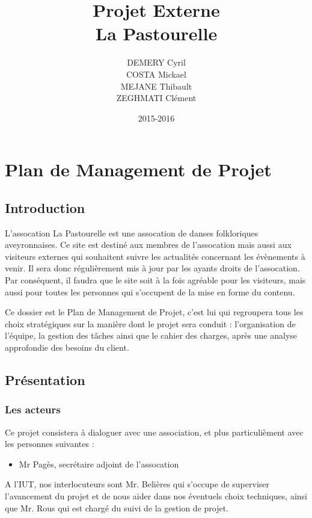 \documentclass[11pt]{report}
\title{Projet Externe\\La Pastourelle}
\author{DEMERY Cyril\\COSTA Mickael\\MEJANE Thibault\\ZEGHMATI Clément}
\date{2015-2016}
\begin{document}
\maketitle
\setcounter{tocdepth}{5}
\chapter{Plan de Management de Projet}
\section{Introduction}
L'assocation La Pastourelle est une assocation de danses folkloriques 
aveyronnaises. Ce site est destiné aux membres de l'assocation mais aussi aux 
visiteurs externes qui souhaitent suivre les actualités concernant les 
évènements à venir. Il sera donc régulièrement mis à jour par les ayants 
droits de l'assocation. Par conséquent, il faudra que le site soit à la fois 
agréable pour les visiteurs, mais aussi pour toutes les personnes qui 
s'occupent de la mise en forme du contenu.\\

\par Ce dossier est le Plan de Management de Projet, c'est lui qui regroupera 
tous les choix stratégiques sur la manière dont le projet sera conduit : 
l'organisation de l'équipe, la gestion des tâches ainsi que le cahier des 
charges, après une analyse approfondie des besoins du client.

\section{Présentation}
\subsection{Les acteurs}
Ce projet consistera à dialoguer avec une association, et plus particulièment 
avec les personnes suivantes : 
\begin{itemize}
    \item Mr Pagès, secrétaire adjoint de l'assocation\\
\end{itemize}

\par A l'IUT, nos interlocuteurs sont Mr. Belières qui s'occupe de superviser 
l'avancement du projet et de nous aider dans nos éventuels choix techniques, 
ainsi que Mr. Rous qui est chargé du suivi de la gestion de projet.   \\
\end{document}
